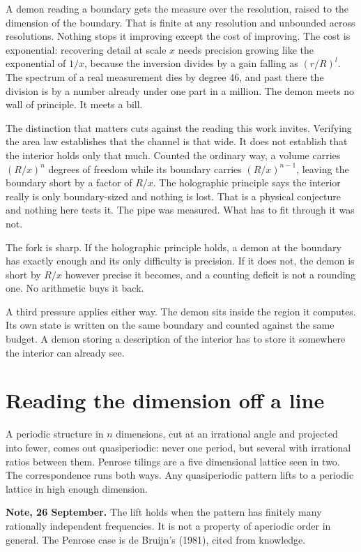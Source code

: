 A demon reading a boundary gets the measure over the resolution, raised to the dimension of the
boundary. That is finite at any resolution and unbounded across resolutions. Nothing stops it
improving except the cost of improving. The cost is exponential: recovering detail at scale $x$
needs precision growing like the exponential of $1/x$, because the inversion divides by a gain
falling as $(r/R)^l$. The spectrum of a real measurement dies by degree 46, and past there the
division is by a number already under one part in a million. The demon meets no wall of principle.
It meets a bill.

The distinction that matters cuts against the reading this work invites. Verifying the area law
establishes that the channel is that wide. It does not establish that the interior holds only that
much. Counted the ordinary way, a volume carries $(R/x)^n$ degrees of freedom while its boundary
carries $(R/x)^{n-1}$, leaving the boundary short by a factor of $R/x$. The holographic principle says
the interior really is only boundary-sized and nothing is lost. That is a physical conjecture and
nothing here tests it. The pipe was measured. What has to fit through it was not.

The fork is sharp. If the holographic principle holds, a demon at the boundary has exactly enough
and its only difficulty is precision. If it does not, the demon is short by $R/x$ however precise it
becomes, and a counting deficit is not a rounding one. No arithmetic buys it back.

A third pressure applies either way. The demon sits inside the region it computes. Its own state
is written on the same boundary and counted against the same budget. A demon storing a description
of the interior has to store it somewhere the interior can already see.

\section{Reading the dimension off a line}

A periodic structure in $n$ dimensions, cut at an irrational angle and projected into fewer, comes
out quasiperiodic: never one period, but several with irrational ratios between them. Penrose
tilings are a five dimensional lattice seen in two. The correspondence runs both ways. Any
quasiperiodic pattern lifts to a periodic lattice in high enough dimension.

\textbf{Note, 26 September.} The lift holds when the pattern has finitely many rationally independent frequencies. It is not a property of aperiodic order in general. The Penrose case is de Bruijn's (1981), cited from knowledge.

